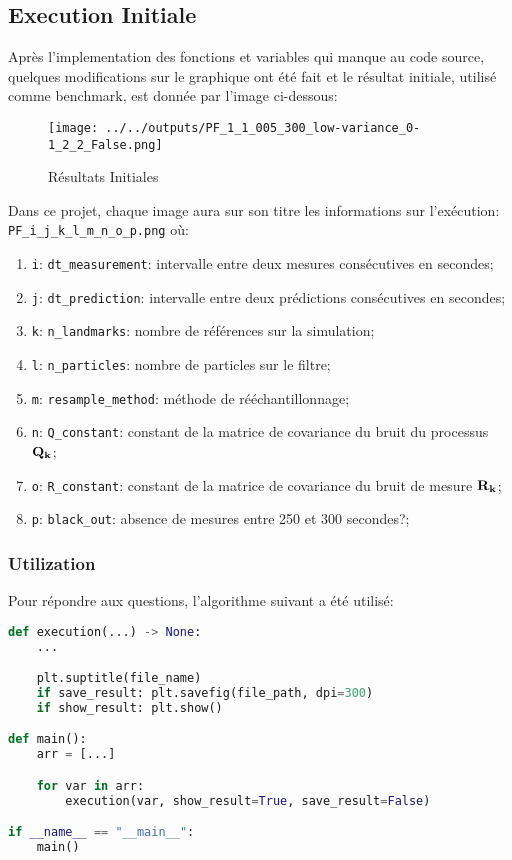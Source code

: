 \documentclass[../CSC_5RO12_TA_TP3.tex]{subfiles}
\begin{document}
\subsection{Execution Initiale}
\noindent Après l'implementation des fonctions et variables qui manque au code source, quelques modifications sur le graphique ont été fait et le résultat initiale, utilisé comme benchmark, est donnée par l'image ci-dessous:
\begin{figure}[H]
    \centering
	\texttt{[image: ../../outputs/PF\_1\_1\_005\_300\_low-variance\_0-1\_2\_2\_False.png]}
	\caption{Résultats Initiales}
	\label{}
\end{figure}
\begin{remark}
    Dans ce projet, chaque image aura sur son titre les informations sur l'exécution: \texttt{PF\_i\_j\_k\_l\_m\_n\_o\_p.png} où:
    \begin{enumerate}[noitemsep]
        \item \texttt{i}: \texttt{dt\_measurement}: intervalle entre deux mesures consécutives en secondes;
        \item \texttt{j}: \texttt{dt\_prediction}: intervalle entre deux prédictions consécutives en secondes;
        \item \texttt{k}: \texttt{n\_landmarks}: nombre de références sur la simulation;
        \item \texttt{l}: \texttt{n\_particles}: nombre de particles sur le filtre;
        \item \texttt{m}: \texttt{resample\_method}: méthode de rééchantillonnage;
        \item \texttt{n}: \texttt{Q\_constant}: constant de la matrice de covariance du bruit du processus $\bf{Q}_{k}$;
        \item \texttt{o}: \texttt{R\_constant}: constant de la matrice de covariance du bruit de mesure $\bf{R}_{k}$;
        \item \texttt{p}: \texttt{black\_out}: absence de mesures entre 250 et 300 secondes?;
    \end{enumerate}
\end{remark}

\subsubsection{Utilization}
\noindent Pour répondre aux questions, l'algorithme suivant a été utilisé:
\begin{scriptsize}\mycode
	\begin{lstlisting}[language=Python]
def execution(...) -> None:
    ...

    plt.suptitle(file_name)
    if save_result: plt.savefig(file_path, dpi=300)
    if show_result: plt.show()

def main():
    arr = [...]

    for var in arr:
        execution(var, show_result=True, save_result=False)

if __name__ == "__main__":
    main()
	\end{lstlisting}
\end{scriptsize}
\end{document}
